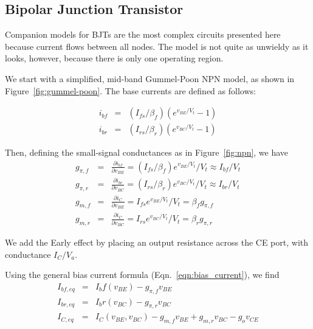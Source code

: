 \documentclass{article}
\begin{document}
\pagebreak

\subsection{Bipolar Junction Transistor}

Companion models for BJTs are the most complex circuits presented here because current flows between all nodes.  The model is not quite as unwieldy as it looks, however, because there is only one operating region.

We start with a simplified, mid-band Gummel-Poon NPN model, as shown in Figure~\ref{fig:gummel-poon}.  The base currents are defined as follows:

\begin{eqnarray}
i_{bf}&=&(I_{fs}/\beta_f)(e^{v_{BE}/V_t}-1) \\
i_{br}&=&(I_{rs}/\beta_r)(e^{v_{BC}/V_t}-1)
\end{eqnarray}

Then, defining the small-signal conductances as in Figure~\ref{fig:npn}, we have
\begin{eqnarray}
g_{\pi,f}&=&\frac{\partial i_{bf}}{\partial v_{BE}}=(I_{fs}/\beta_f)e^{v_{BE}/V_t}/V_t \approx I_{bf}/V_t \\
g_{\pi,r}&=&\frac{\partial i_{br}}{\partial v_{BC}}=(I_{rs}/\beta_r)e^{v_{BC}/V_t}/V_t \approx I_{br}/V_t \\
g_{m,f}&=&\frac{\partial i_C}{\partial v_{BE}}=I_{fs}e^{v_{BE}/V_t}/V_t=\beta_fg_{\pi,f} \\
g_{m,r}&=&\frac{\partial i_C}{\partial v_{BC}}=I_{rs}e^{v_{BC}/V_t}/V_t=\beta_rg_{\pi,r}
\end{eqnarray}

We add the Early effect by placing an output resistance across the CE port, with conductance $I_C/V_a$.

Using the general bias current formula (Eqn.~\ref{eqn:bias_current}), we find
\begin{eqnarray}
I_{bf,eq}&=&I_bf(v_{BE})-g_{\pi,f}v_{BE} \\
I_{br,eq}&=&I_br(v_{BC})-g_{\pi,r}v_{BC} \\
I_{C,eq}&=&I_C(v_{BE},v_{BC})-g_{m,f}v_{BE}+g_{m,r}v_{BC}-g_ov_{CE}
\end{eqnarray}
\end{document}
